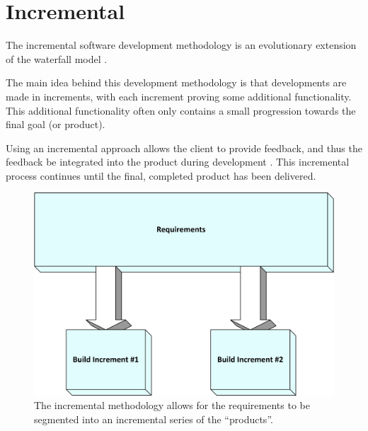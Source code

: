 \section{Incremental}
The incremental software development methodology is an evolutionary extension 
of the waterfall model \citep{pressman09}. 

The main idea behind this development methodology is that developments are made
in increments, with each increment proving some additional functionality. This
additional functionality often only contains a small progression towards the 
final goal (or product).

Using an incremental approach allows the client to provide feedback, and thus 
the feedback be integrated into the product during development 
\citep{elliott04}. This incremental process continues until the final, 
completed product has been delivered. 

\begin{figure}[H]
  \centering
  \includegraphics[scale=0.6]{chapter6/incremental.png}
    \caption[Incremental methodology]
      {The incremental methodology allows for the requirements to be segmented 
      into an incremental series of the ``products''.}
\end{figure}

